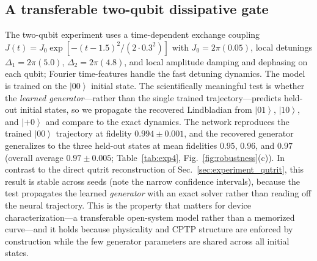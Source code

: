 \documentclass[twocolumn,aps,prxquantum,superscriptaddress,nofootinbib,floatfix,longbibliography]{revtex4-2}
\newcommand{\ket}[1]{\left\lvert #1 \right\rangle}
\begin{document}
\subsection{A transferable two-qubit dissipative gate}
\label{sec:experiment_twoqubit}

The two-qubit experiment uses a time-dependent exchange coupling $J(t)=J_0\exp[-(t-1.5)^2/(2\cdot0.3^2)]$ with $J_0=2\pi(0.05)$, local detunings $\Delta_1=2\pi(5.0)$, $\Delta_2=2\pi(4.8)$, and local amplitude damping and dephasing on each qubit; Fourier time-features handle the fast detuning dynamics. The model is trained on the $\ket{00}$ initial state. The scientifically meaningful test is whether the \emph{learned generator}---rather than the single trained trajectory---predicts held-out initial states, so we propagate the recovered Lindbladian from $\ket{01}$, $\ket{10}$, and $\ket{+0}$ and compare to the exact dynamics. The network reproduces the trained $\ket{00}$ trajectory at fidelity $0.994\pm0.001$, and the recovered generator generalizes to the three held-out states at mean fidelities $0.95$, $0.96$, and $0.97$ (overall average $0.97\pm0.005$; Table~\ref{tab:exp4}, Fig.~\ref{fig:robustness}(c)). In contrast to the direct qutrit reconstruction of Sec.~\ref{sec:experiment_qutrit}, this result is stable across seeds (note the narrow confidence intervals), because the test propagates the learned \emph{generator} with an exact solver rather than reading off the neural trajectory. This is the property that matters for device characterization---a transferable open-system model rather than a memorized curve---and it holds because physicality and CPTP structure are enforced by construction while the few generator parameters are shared across all initial states.
\end{document}
